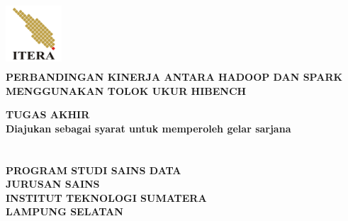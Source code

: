 \begin{titlepage}
\begin{center}
\includegraphics[height=2.5cm, width=2.1cm]{LogoITERA.png}\\[5ex]
\textbf{\fontsize{14pt}{0}\selectfont PERBANDINGAN KINERJA ANTARA HADOOP DAN SPARK MENGGUNAKAN TOLOK UKUR HIBENCH}\\
\vspace{3cm}

\textbf{\fontsize{14pt}{0}\selectfont  TUGAS AKHIR}\\
\textbf{\fontsize{12pt}{0}\selectfont  Diajukan sebagai syarat untuk memperoleh gelar sarjana}\\[18ex]
\textbf{\fontsize{12pt}{0}\selectfont{Dimas Wahyu Saputro}}\\ 
\textbf{\fontsize{12pt}{0}\selectfont{120450081}}\\[20ex]
\textbf{\fontsize{12pt}{0}\selectfont PROGRAM STUDI SAINS DATA}\\
\textbf{\fontsize{12pt}{0}\selectfont JURUSAN SAINS}\\
\textbf{\fontsize{12pt}{0}\selectfont INSTITUT TEKNOLOGI SUMATERA}\\
\textbf{\fontsize{12pt}{0}\selectfont LAMPUNG SELATAN}\\
\textbf{\fontsize{12pt}{0}}\\
\vspace{3cm}
\end{center}
\end{titlepage}
